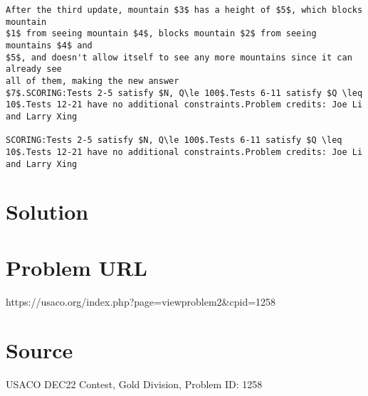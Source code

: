 \documentclass[12pt]{article}
\begin{document}
\begin{verbatim}
After the third update, mountain $3$ has a height of $5$, which blocks mountain
$1$ from seeing mountain $4$, blocks mountain $2$ from seeing mountains $4$ and
$5$, and doesn't allow itself to see any more mountains since it can already see
all of them, making the new answer
$7$.SCORING:Tests 2-5 satisfy $N, Q\le 100$.Tests 6-11 satisfy $Q \leq 10$.Tests 12-21 have no additional constraints.Problem credits: Joe Li and Larry Xing

SCORING:Tests 2-5 satisfy $N, Q\le 100$.Tests 6-11 satisfy $Q \leq 10$.Tests 12-21 have no additional constraints.Problem credits: Joe Li and Larry Xing
\end{verbatim}

\section*{Solution}


\section*{Problem URL}
https://usaco.org/index.php?page=viewproblem2&cpid=1258

\section*{Source}
USACO DEC22 Contest, Gold Division, Problem ID: 1258
\end{document}
